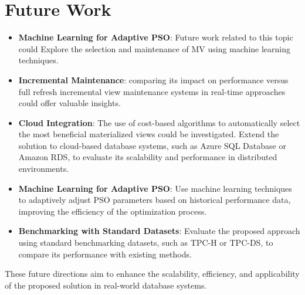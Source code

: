 \section{Future Work}
\begin{itemize}
     \item \textbf{Machine Learning for Adaptive PSO}: Future work related to this topic could Explore the selection and maintenance of MV using machine learning techniques.
    
    \item \textbf{Incremental Maintenance}: comparing its impact on performance versus full refresh incremental view maintenance systems in real-time approaches could offer valuable insights.
    
    \item \textbf{Cloud Integration}: The use of cost-based algorithms to automatically select the most beneficial materialized views could be investigated. Extend the solution to cloud-based database systems, such as Azure SQL Database or Amazon RDS, to evaluate its scalability and performance in distributed environments.
    
    \item \textbf{Machine Learning for Adaptive PSO}: Use machine learning techniques to adaptively adjust PSO parameters based on historical performance data, improving the efficiency of the optimization process.
    
    \item \textbf{Benchmarking with Standard Datasets}: Evaluate the proposed approach using standard benchmarking datasets, such as TPC-H or TPC-DS, to compare its performance with existing methods.
\end{itemize}

These future directions aim to enhance the scalability, efficiency, and applicability of the proposed solution in real-world database systems.\\
